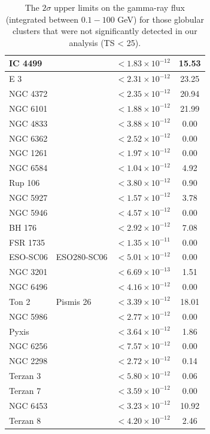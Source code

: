 \begin{longtable}{|l|l|l|c|}
\hline
\noalign{\vspace{10pt}}
\caption{The $2\sigma$ upper limits on the gamma-ray flux (integrated between $0.1-100$ GeV) for those globular clusters that were not significantly detected in our analysis (TS < 25).}
\endlastfoot %
IC 4499 & & $<1.83\times 10^{-12}$ & 15.53 \\\hline
E 3 & & $<2.31\times 10^{-12}$ & 23.25 \\\hline
NGC 4372 & & $<2.35\times 10^{-12}$ & 20.94 \\\hline
NGC 6101 & & $<1.88\times 10^{-12}$ & 21.99 \\\hline
NGC 4833 & & $<3.88\times 10^{-12}$ & 0.00 \\\hline
NGC 6362 & & $<2.52\times 10^{-12}$ & 0.00 \\\hline
NGC 1261 & & $<1.97\times 10^{-12}$ & 0.00 \\\hline
NGC 6584 & & $<1.04\times 10^{-12}$ & 4.92 \\\hline
Rup 106 & & $<3.80\times 10^{-12}$ & 0.90 \\\hline
NGC 5927 & & $<1.57\times 10^{-12}$ & 3.78 \\\hline
NGC 5946 & & $<4.57\times 10^{-12}$ & 0.00 \\\hline
BH 176 & & $<2.92\times 10^{-12}$ & 7.08 \\\hline
FSR 1735 & & $<1.35\times 10^{-11}$ & 0.00 \\\hline
ESO-SC06 & ESO280-SC06& $<5.01\times 10^{-12}$ & 0.00 \\\hline
NGC 3201 & & $<6.69\times 10^{-13}$ & 1.51 \\\hline
NGC 6496 & & $<4.16\times 10^{-12}$ & 0.00 \\\hline
Ton 2 & Pismis 26& $<3.39\times 10^{-12}$ & 18.01 \\\hline
NGC 5986 & & $<2.77\times 10^{-12}$ & 0.00 \\\hline
Pyxis & & $<3.64\times 10^{-12}$ & 1.86 \\\hline
NGC 6256 & & $<7.57\times 10^{-12}$ & 0.00 \\\hline
NGC 2298 & & $<2.72\times 10^{-12}$ & 0.14 \\\hline
Terzan 3 & & $<5.80\times 10^{-12}$ & 0.06 \\\hline
Terzan 7 & & $<3.59\times 10^{-12}$ & 0.00 \\\hline
NGC 6453 & & $<3.23\times 10^{-12}$ & 10.92 \\\hline
Terzan 8 & & $<4.20\times 10^{-12}$ & 2.46 \\ \hline

\end{longtable}
